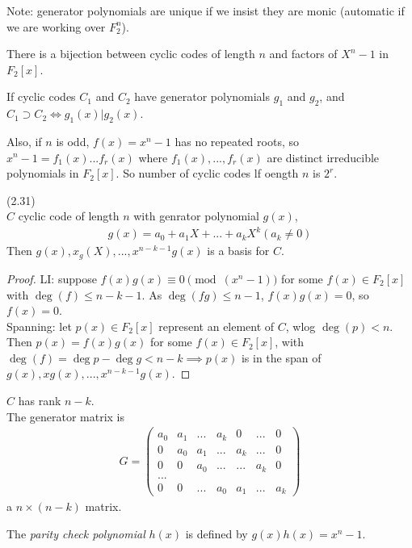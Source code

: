 \documentclass[a4paper]{article}
\begin{document}
Note: generator polynomials are unique if we insist they are monic (automatic if we are working over $F_2^n$).

\begin{coro}
There is a bijection between cyclic codes of length $n$ and factors of $X^n-1$ in $F_2[x]$.
\end{coro}

If cyclic codes $C_1$ and $C_2$ have generator polynomials $g_1$ and $g_2$, and $C_1 \supset C_2 \iff g_1(x) | g_2(x)$.

Also, if $n$ is odd, $f(x) = x^n-1$ has no repeated roots, so $x^n-1 = f_1(x) ... f_r(x)$ where $f_1(x),...,f_r(x)$ are distinct irreducible polynomials in $F_2[x]$. So number of cyclic codes lf oength $n$ is $2^r$.

\begin{lemma} (2.31)\\
$C$ cyclic code of length $n$ with genrator polynomial $g(x)$,
\begin{equation*}
\begin{aligned}
g(x) = a_0 + a_1 X + ... + a_k X^k (a_k \neq 0)
\end{aligned}
\end{equation*}
Then $g(x), x_g(X),...,x^{n-k-1} g(x)$ is a basis for $C$.
\begin{proof}
LI: suppose $f(x) g(x) \equiv 0 \pmod (x^n-1)$ for some $f(x) \in F_2[x]$ with $\deg(f) \leq n-k-1$. As $\deg (fg) \leq n-1$, $f(x)g(x) = 0$, so $f(x) = 0$.\\
Spanning: let $p(x) \in F_2[x]$ represent an element of $C$, wlog $\deg(p)< n$. Then $p(x) = f(x)g(x)$ for some $f(x) \in F_2[x]$, with $\deg (f) = \deg p - \deg g < n-k \implies p(x)$ is in the span of $g(x),xg(x),...,x^{n-k-1}g(x)$.
\end{proof}
\end{lemma}

\begin{coro}
$C$ has rank $n-k$.\\
The generator matrix is 
\begin{equation*}
\begin{aligned}
G = \begin{pmatrix}
a_0 & a_1 & ... & a_k & 0 & ... & 0\\
0 & a_0 & a_1 & ... & a_k & ... & 0\\
0 & 0 & a_0 & ... & ... & a_k & 0\\
...\\
0 & 0 & ... & a_0 & a_1 & ... & a_k
\end{pmatrix}
\end{aligned}
\end{equation*}
a $n \times (n-k)$ matrix.
\end{coro}

\begin{defi}
The \emph{parity check polynomial} $h(x)$ is defined by $g(x) h(x) = x^n-1$.
\end{defi}

\end{document}
